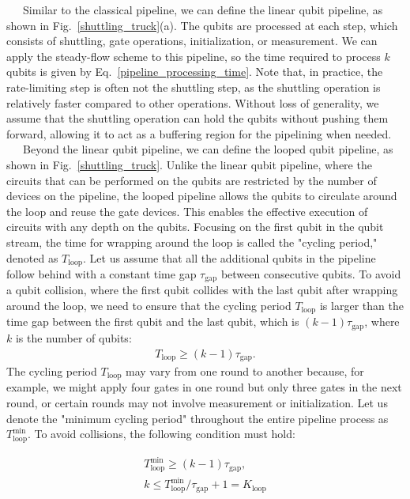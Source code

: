 \documentclass[a4paper,11pt]{ltjsarticle}
\begin{document}
{{        \ \ \ Similar to the classical pipeline, we can define the linear qubit pipeline, as shown in Fig.~\ref{shuttling_truck}(a). The qubits are processed at each step, which consists of shuttling, gate operations, initialization, or measurement. We can apply the steady-flow scheme to this pipeline, so the time required to process $k$ qubits is given by Eq.~\ref{pipeline_processing_time}. Note that, in practice, the rate-limiting step is often not the shuttling step, as the shuttling operation is relatively faster compared to other operations. Without loss of generality, we assume that the shuttling operation can hold the qubits without pushing them forward, allowing it to act as a buffering region for the pipelining when needed.\\
        \ \ \ Beyond the linear qubit pipeline, we can define the looped qubit pipeline, as shown in Fig.~\ref{shuttling_truck}. Unlike the linear qubit pipeline, where the circuits that can be performed on the qubits are restricted by the number of devices on the pipeline, the looped pipeline allows the qubits to circulate around the loop and reuse the gate devices. This enables the effective execution of circuits with any depth on the qubits. Focusing on the first qubit in the qubit stream, the time for wrapping around the loop is called the "cycling period," denoted as $T_\text{loop}$. Let us assume that all the additional qubits in the pipeline follow behind with a constant time gap $\tau_\text{gap}$ between consecutive qubits. To avoid a qubit collision, where the first qubit collides with the last qubit after wrapping around the loop, we need to ensure that the cycling period $T_\text{loop}$ is larger than the time gap between the first qubit and the last qubit, which is $(k-1)\tau_\text{gap}$, where $k$ is the number of qubits:
        \begin{align}
            T_\text{loop}\ge (k-1)\tau_\text{gap}.
        \end{align}
        The cycling period $T_\text{loop}$ may vary from one round to another because, for example, we might apply four gates in one round but only three gates in the next round, or certain rounds may not involve measurement or initialization. Let us denote the "minimum cycling period" throughout the entire pipeline process as $T_\text{loop}^\text{min}$. To avoid collisions, the following condition must hold:

        \begin{align}
            T_\text{loop}^\text{min}\ge (k-1)\tau_\text{gap},\\
            k\leq T_\text{loop}^\text{min}/\tau_\text{gap} + 1 = K_\text{loop}
        \end{align}

}}
\end{document}
